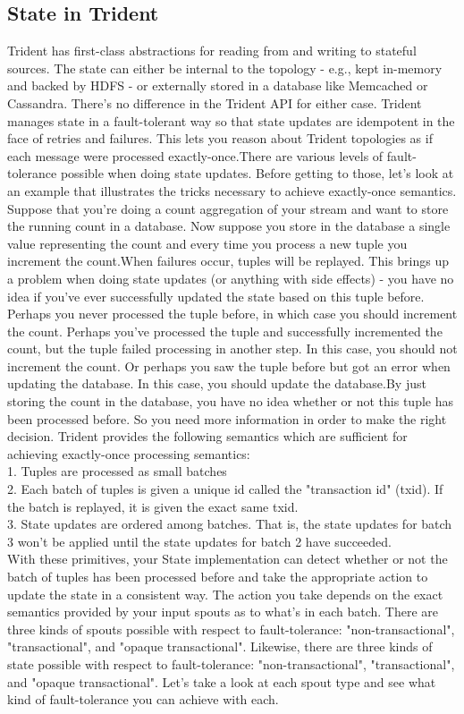 \subsection*{State in Trident}
Trident has first-class abstractions for reading from and writing to stateful sources. The state can either be internal to the topology - e.g., kept in-memory and backed by HDFS - or externally stored in a database like Memcached or Cassandra. There's no difference in the Trident API for either case.
Trident manages state in a fault-tolerant way so that state updates are idempotent in the face of retries and failures. This lets you reason about Trident topologies as if each message were processed exactly-once.There are various levels of fault-tolerance possible when doing state updates. Before getting to those, let's look at an example that illustrates the tricks necessary to achieve exactly-once semantics. Suppose that you're doing a count aggregation of your stream and want to store the running count in a database. Now suppose you store in the database a single value representing the count and every time you process a new tuple you increment the count.When failures occur, tuples will be replayed. This brings up a problem when doing state updates (or anything with side effects) - you have no idea if you've ever successfully updated the state based on this tuple before. Perhaps you never processed the tuple before, in which case you should increment the count. Perhaps you've processed the tuple and successfully incremented the count, but the tuple failed processing in another step. In this case, you should not increment the count. Or perhaps you saw the tuple before but got an error when updating the database. In this case, you should update the database.By just storing the count in the database, you have no idea whether or not this tuple has been processed before. So you need more information in order to make the right decision. Trident provides the following semantics which are sufficient for achieving exactly-once processing semantics:\\[2mm]
1. Tuples are processed as small batches\\[2mm]
2. Each batch of tuples is given a unique id called the "transaction id" (txid). If the batch is replayed, it is given the exact same txid.\\[2mm]
3. State updates are ordered among batches. That is, the state updates for batch 3 won't be applied until the state updates for batch 2 have succeeded.\\[2mm]
With these primitives, your State implementation can detect whether or not the batch of tuples has been processed before and take the appropriate action to update the state in a consistent way. The action you take depends on the exact semantics provided by your input spouts as to what's in each batch. There are three kinds of spouts possible with respect to fault-tolerance: "non-transactional", "transactional", and "opaque transactional". Likewise, there are three kinds of state possible with respect to fault-tolerance: "non-transactional", "transactional", and "opaque transactional". Let's take a look at each spout type and see what kind of fault-tolerance you can achieve with each.

